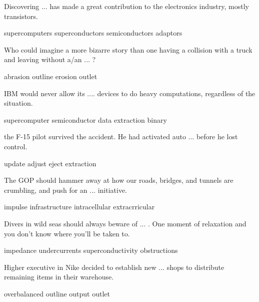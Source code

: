 \documentclass{exam}
\begin{document}
\begin{questions}
\question Discovering ... has made a great contribution to the electronics industry, mostly transistors.\\
\begin{oneparchoices} 
\choice supercomputers
\choice superconductors
\correctchoice semiconductors
\choice adaptors
\end{oneparchoices}

\question Who could imagine a more bizarre story than one having a collision with a truck and leaving without a/an ... ?\\
\begin{oneparchoices} 
\correctchoice abrasion
\choice outline
\choice erosion
\choice outlet 
\end{oneparchoices}

\question IBM would never allow its  .... devices to do heavy computations, regardless of the situation.\\
\begin{oneparchoices} 
\correctchoice supercomputer
\choice semiconductor 
\choice data extraction
\choice binary 
\end{oneparchoices}

\question the F-15 pilot survived the accident. He had activated auto ... before he lost control.\\
\begin{oneparchoices}
\choice update
\choice adjust
\correctchoice eject
\choice extraction 
\end{oneparchoices}
\question The GOP should hammer away at how our roads, bridges, and tunnels are crumbling, and push for an ... initiative.\\
\begin{oneparchoices}
\choice impulse 
 \correctchoice infrastructure
 \choice intracellular
 \choice extracrricular
\end{oneparchoices}
\question Divers in wild seas should always beware of ... . One moment of relaxation and you don't know where you'll be taken to.\\
\begin{oneparchoices}
\choice impedance
\correctchoice undercurrents
\choice superconductivity
\choice obstructions 
\end{oneparchoices}

\question Higher executive in Nike decided to establish new ... shops to distribute remaining items in their warehouse.\\
\begin{oneparchoices}
\choice overbalanced
\choice outline
\choice output
\correctchoice outlet
\end{oneparchoices}


\end{questions}
\end{document}
